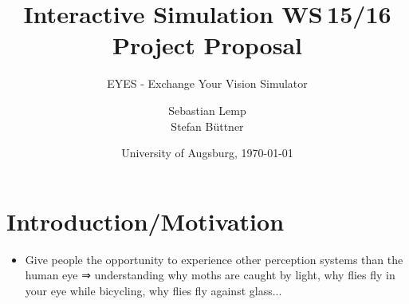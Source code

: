 \documentclass{acm_proc_article-sp}
\begin{document}
\title{
Interactive Simulation WS 15/16\\ %
Project Proposal
}
\subtitle{EYES - Exchange Your Vision Simulator}
\author{
\alignauthor
Sebastian Lemp\\
\alignauthor
Stefan Büttner\\
}

\date{University of Augsburg, \today}




\maketitle

\section{Introduction/Motivation}
\begin{itemize}
  \item Give people the opportunity to experience other perception systems
  than the human eye ⇒ understanding why moths are caught by light, why
  flies fly in your eye while bicycling, why flies fly against glass...

\end{itemize}
\end{document}
